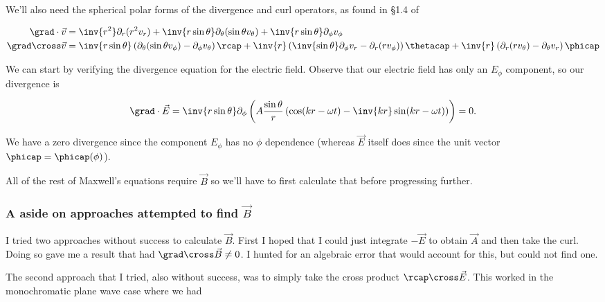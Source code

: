 We'll also need the spherical polar forms of the divergence and curl operators, as found in \S 1.4 of \cite{griffith1981introduction}

\begin{align}\label{eqn:relElectroDynProblemSet4:440}
\grad \cdot \vec{v} &=
\inv{r^2} \partial_r ( r^2 v_r )
+ \inv{r\sin\theta} \partial_\theta (\sin\theta v_\theta)
+ \inv{r\sin\theta} \partial_\phi v_\phi \\
\grad \cross \vec{v} &=
\inv{r \sin\theta} \left(
\partial_\theta (\sin\theta v_\phi) - \partial_\phi v_\theta
\right) \rcap
+
\inv{r } \left(
\inv{\sin\theta} \partial_\phi v_r - \partial_r (r v_\phi)
\right) \thetacap
+
\inv{r } \left(
\partial_r (r v_\theta) - \partial_\theta v_r
\right) \phicap
\end{align}

We can start by verifying the divergence equation for the electric field.  Observe that our electric field has only an $E_\phi$ component, so our divergence is

\begin{equation}\label{eqn:relElectroDynProblemSet4:460}
\grad \cdot \vec{E}
=
\inv{r\sin\theta} \partial_\phi \left(
A \frac{\sin\theta}{r} \left( \cos(k r - \omega t) - \inv{kr} \sin(k r - \omega t) \right) \right) = 0.
\end{equation}

We have a zero divergence since the component $E_\phi$ has no $\phi$ dependence (whereas $\vec{E}$ itself does since the unit vector $\phicap = \phicap(\phi)$).

All of the rest of Maxwell's equations require $\vec{B}$ so we'll have to first calculate that before progressing further.

\subsubsection{A aside on approaches attempted to find $\vec{B}$}

I tried two approaches without success to calculate $\vec{B}$.  First I hoped that I could just integrate $-\vec{E}$ to obtain $\vec{A}$ and then take the curl.  Doing so gave me a result that had $\grad \cross \vec{B} \ne 0$.  I hunted for an algebraic error that would account for this, but could not find one.

The second approach that I tried, also without success, was to simply take the cross product $\rcap \cross \vec{E}$.  This worked in the monochromatic plane wave case where we had

